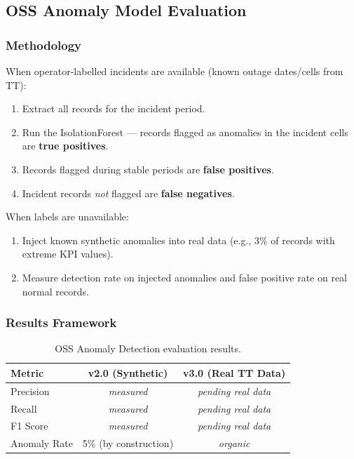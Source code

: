 \subsection{OSS Anomaly Model Evaluation}

\subsubsection{Methodology}

When operator-labelled incidents are available (known outage dates/cells from TT):
\begin{enumerate}
  \item Extract all records for the incident period.
  \item Run the IsolationForest --- records flagged as anomalies in the incident cells are \textbf{true positives}.
  \item Records flagged during stable periods are \textbf{false positives}.
  \item Incident records \emph{not} flagged are \textbf{false negatives}.
\end{enumerate}

When labels are unavailable:
\begin{enumerate}
  \item Inject known synthetic anomalies into real data (e.g., 3\% of records with extreme KPI values).
  \item Measure detection rate on injected anomalies and false positive rate on real normal records.
\end{enumerate}

\subsubsection{Results Framework}

\begin{table}[H]
\centering
\caption{OSS Anomaly Detection evaluation results.}
\label{tab:oss-anomaly-results}
\begin{tabular}{@{}lcc@{}}
\toprule
\textbf{Metric} & \textbf{v2.0 (Synthetic)} & \textbf{v3.0 (Real TT Data)} \\
\midrule
Precision & \textit{measured} & \textit{pending real data} \\
Recall    & \textit{measured} & \textit{pending real data} \\
F1 Score  & \textit{measured} & \textit{pending real data} \\
Anomaly Rate & 5\% (by construction) & \textit{organic} \\
\bottomrule
\end{tabular}
\end{table}


